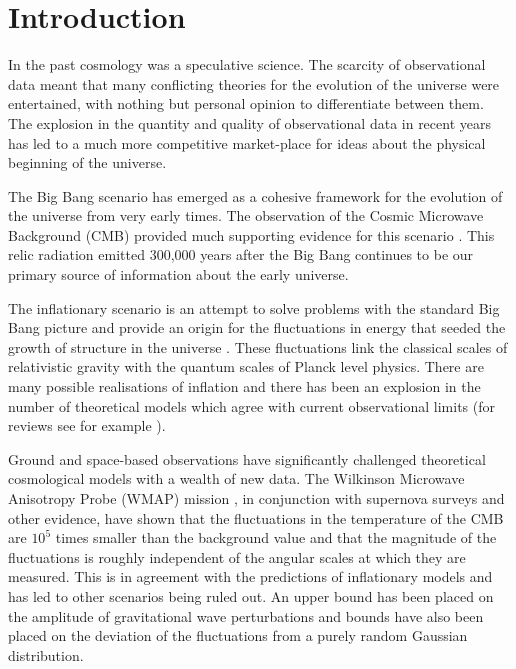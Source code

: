 \renewcommand{\CVSrevision}%
{\version$Id: shortintro.tex,v 1.8 2009/11/16 16:58:58 ith Exp $}

\chapter{Introduction}
\label{ch:shortintro}
In the past cosmology was a speculative science. The scarcity of observational
data meant that many conflicting theories for the evolution of the universe were
entertained, with nothing but personal opinion to differentiate between them.
The explosion in the quantity and quality of observational data in recent years
has led to a much more competitive market-place for ideas about the physical
beginning of the universe.

The Big Bang scenario has emerged as a cohesive framework for the evolution of
the universe from very early times. The observation of the Cosmic
Microwave Background (CMB) provided much supporting evidence for this scenario
\cite{book:kolbturner}. This
relic radiation emitted 300,000 years after the Big Bang continues to
be our primary source of information about the early universe.

The inflationary scenario is an attempt to solve problems with the standard Big
Bang picture and provide an origin for the fluctuations in energy that seeded
the growth of structure in the universe
\cite{Starobinsky:1980te,Guth:1980zm,Albrecht:1982wi,Linde:1981mu,
Starobinsky:1982ee}. These fluctuations link the classical scales of
relativistic gravity with the quantum scales of Planck level physics. There are
many possible realisations of inflation and there has been an explosion in the
number of theoretical models which agree with current observational limits
(for reviews see for example \cite{book:liddle, Alabidi:2008ej, Baumann2009}).

Ground and space-based observations have significantly challenged theoretical
cosmological models with a wealth of new data. The Wilkinson Microwave
Anisotropy Probe (WMAP) mission \cite{Komatsu:2008hk}, in conjunction with supernova
surveys and other evidence, have shown that the fluctuations in
the temperature of the CMB are $10^{5}$ times smaller than the background value
and that the magnitude of the fluctuations is roughly independent of the
angular scales at which they are measured. This is in agreement with the
predictions of inflationary models and has led to other scenarios being ruled
out. An upper bound has been placed
on the amplitude of gravitational wave perturbations and bounds have also been
placed on the deviation of the fluctuations from a purely random Gaussian
distribution.


